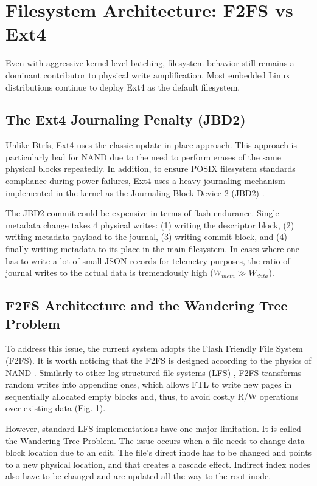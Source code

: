 \documentclass[conference]{IEEEtran}
\begin{document}
\section{Filesystem Architecture: F2FS vs Ext4}

Even with aggressive kernel-level batching, filesystem behavior still remains a dominant contributor to physical write amplification. Most embedded Linux distributions continue to deploy Ext4 as the default filesystem.

\subsection{The Ext4 Journaling Penalty (JBD2)}
Unlike Btrfs, Ext4 uses the classic update-in-place approach. This approach is particularly bad for NAND due to the need to perform erases of the same physical blocks repeatedly. In addition, to ensure POSIX filesystem standards compliance during power failures, Ext4 uses a heavy journaling mechanism implemented in the kernel as the Journaling Block Device 2 (JBD2) \cite{b20}.

The JBD2 commit could be expensive in terms of flash endurance. Single metadata change takes 4 physical writes: (1) writing the descriptor block, (2) writing metadata payload to the journal, (3) writing commit block, and (4) finally writing metadata to its place in the main filesystem. In cases where one has to write a lot of small JSON records for telemetry purposes, the ratio of journal writes to the actual data is tremendously high ($W_{meta} \gg W_{data}$).

\subsection{F2FS Architecture and the Wandering Tree Problem}
To address this issue, the current system adopts the Flash Friendly File System (F2FS). It is worth noticing that the F2FS is designed according to the physics of NAND \cite{b18}. Similarly to other log-structured file systems (LFS) \cite{b17, b19}, F2FS transforms random writes into appending ones, which allows FTL to write new pages in sequentially allocated empty blocks and, thus, to avoid costly R/W operations over existing data (Fig. 1).

However, standard LFS implementations have one major limitation. It is called the Wandering Tree Problem. The issue occurs when a file needs to change data block location due to an edit. The file’s direct inode has to be changed and points to a new physical location, and that creates a cascade effect. Indirect index nodes also have to be changed and are updated all the way to the root inode.
\end{document}
